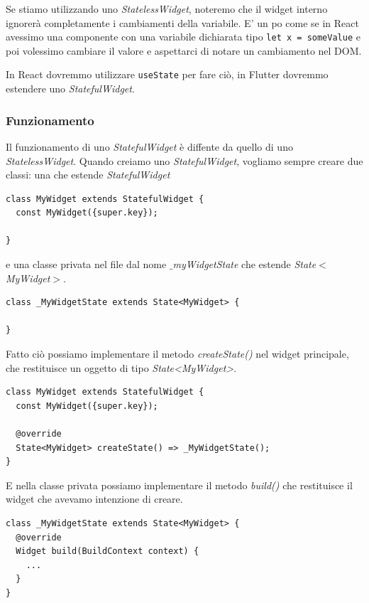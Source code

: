 \documentclass[12pt]{article}
\begin{document}
Se stiamo utilizzando uno \textit{StatelessWidget},
noteremo che il widget interno ignorerà completamente
i cambiamenti della variabile. E' un po come se in React
avessimo una componente con una variabile dichiarata tipo
\texttt{let x = someValue} e poi volessimo cambiare il valore e aspettarci di notare un cambiamento nel DOM.

In React dovremmo utilizzare \texttt{useState} per fare ciò, in Flutter dovremmo estendere uno \textit{StatefulWidget}.

\subsubsection{Funzionamento}
Il funzionamento di uno \textit{StatefulWidget} è diffente da quello di uno \textit{StatelessWidget}. Quando creiamo uno \textit{StatefulWidget}, vogliamo sempre creare due classi: una che estende \textit{StatefulWidget}
\begin{highlight}
\begin{verbatim}
class MyWidget extends StatefulWidget {
  const MyWidget({super.key});

}
\end{verbatim}
\end{highlight}

e una classe privata nel file dal nome \textit{$\_$myWidgetState} che estende \textit{State$<$MyWidget$>$}.

\begin{highlight}
\begin{verbatim}
class _MyWidgetState extends State<MyWidget> {

}
\end{verbatim}
\end{highlight}

Fatto ciò possiamo implementare il metodo \textit{createState()}
nel widget principale,
che restituisce un oggetto di tipo \textit{State<MyWidget>}.

\begin{highlight}
\begin{verbatim}
class MyWidget extends StatefulWidget {
  const MyWidget({super.key});

  @override
  State<MyWidget> createState() => _MyWidgetState();
}
\end{verbatim}
\end{highlight}

E nella classe privata possiamo implementare il metodo \textit{build()} che restituisce il widget che avevamo intenzione di creare.
\begin{highlight}
\begin{verbatim}
class _MyWidgetState extends State<MyWidget> {
  @override
  Widget build(BuildContext context) {
    ...
  }
}
\end{verbatim}
\end{highlight}
\end{document}
